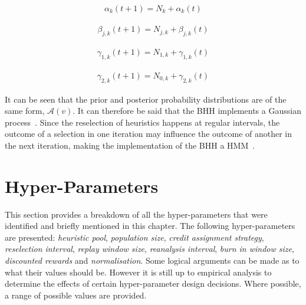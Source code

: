 \begin{equation}
      \label{eq:bhh:optimisation_step:map:alpha_update_operation}
      \begin{split}
            \alpha_{k}(t+1) = N_{k} + \alpha_{k}(t)
      \end{split}
\end{equation}

\begin{equation}
      \label{eq:bhh:optimisation_step:map:beta_update_operation}
      \begin{split}
            \beta_{j,k}(t+1) = N_{j,k} + \beta_{j,k}(t)
      \end{split}
\end{equation}

\begin{equation}
      \label{eq:bhh:optimisation_step:map:gamma1_update_operation}
      \begin{split}
            \gamma_{1,k}(t+1) = N_{1,k} + \gamma_{1,k}(t)
      \end{split}
\end{equation}

\begin{equation}
      \label{eq:bhh:optimisation_step:map:gamma2_update_operation}
      \begin{split}
            \gamma_{2,k}(t+1) = N_{0,k} + \gamma_{2,k}(t)
      \end{split}
\end{equation}

It can be seen that the prior and posterior probability distributions are of the same form, $\mathcal{A}(v)$. It can therefore be said that the \acs{BHH} implements a Gaussian process~\cite{ref:gortler:2019}. Since the reselection of heuristics happens at regular intervals, the outcome of a selection in one iteration may influence the outcome of another in the next iteration, making the implementation of the \acs{BHH} a \acs{HMM}~\cite{ref:rabiner:1986}.


\section{Hyper-Parameters}\label{sec:bhh:hyper_parameters}

This section provides a breakdown of all the hyper-parameters that were identified and briefly mentioned in this chapter. The following hyper-parameters are presented: \textit{heuristic pool}, \textit{population size}, \textit{credit assignment strategy}, \textit{reselection interval}, \textit{replay window size}, \textit{reanalysis interval}, \textit{burn in window size}, \textit{discounted rewards} and \textit{normalisation}. Some logical arguments can be made as to what their values should be. However it is still up to empirical analysis to determine the effects of certain hyper-parameter design decisions. Where possible, a range of possible values are provided.

